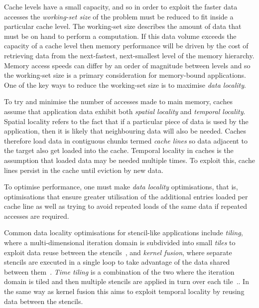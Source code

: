 Cache levels have a small capacity, and so in order to exploit the faster data accesses the \textit{working-set size} of the problem must be reduced to fit inside a particular cache level.
The working-set size describes the amount of data that must be on hand to perform a computation.
If this data volume exceeds the capacity of a cache level then memory performance will be driven by the cost of retrieving data from the next-fastest, next-smallest level of the memory hierarchy.
Memory access speeds can differ by an order of magnitude between levels and so the working-set size is a primary consideration for memory-bound applications.
One of the key ways to reduce the working-set size is to maximise \textit{data locality}.

To try and minimise the number of accesses made to main memory, caches assume that application data exhibit both \textit{spatial locality} and \textit{temporal locality}.
Spatial locality refers to the fact that if a particular piece of data is used by the application, then it is likely that neighbouring data will also be needed.
Caches therefore load data in contiguous chunks termed \textit{cache lines} so data adjacent to the target also get loaded into the cache.
Temporal locality in caches is the assumption that loaded data may be needed multiple times.
To exploit this, cache lines persist in the cache until eviction by new data.

To optimise performance, one must make \textit{data locality} optimisations, that is, optimisations that ensure greater utilisation of the additional entries loaded per cache line as well as trying to avoid repeated loads of the same data if repeated accesses are required.

Common data locality optimisations for stencil-like applications include \textit{tiling}, where a multi-dimensional iteration domain is subdivided into small \textit{tiles} to exploit data reuse between the stencils~\cite{irigoinSupernodePartitioning1988,ramanujamTilingMultidimensionalIteration1992}, and \textit{kernel fusion}, where separate stencils are executed in a single loop to take advantage of the data shared between them~\cite{darteComplexityLoopFusion2000}.
\textit{Time tiling} is a combination of the two where the iteration domain is tiled and then multiple stencils are applied in turn over each tile~\cite{luporiniAutomatedTilingUnstructured2019}..
In the same way as kernel fusion this aims to exploit temporal locality by reusing data between the stencils.

